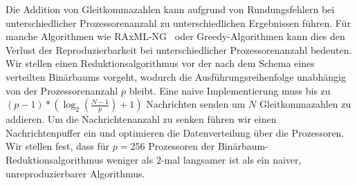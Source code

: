 
\Abstract
Die Addition von Gleitkommazahlen kann aufgrund von Rundungsfehlern bei unterschiedlicher Prozessorenanzahl zu unterschiedlichen Ergebnissen führen.
Für manche Algorithmen wie RAxML-NG~\cite{kozlov_raxml-ng_2019} oder Greedy-Algorithmen kann dies den Verlust der Reproduzierbarkeit bei unterschiedlicher Prozessorenanzahl bedeuten.
Wir stellen einen Reduktionsalgorithmus vor der nach dem Schema eines verteilten Binärbaums vorgeht, wodurch die Ausführungsreihenfolge unabhängig von der Prozessorenanzahl $p$ bleibt.
Eine naive Implementierung muss bis zu $(p - 1) * (\log_2 (\tfrac{N-1}{p}) + 1)$ Nachrichten senden um $N$ Gleitkommazahlen zu addieren.
Um die Nachrichtenanzahl zu senken führen wir einen Nachrichtenpuffer ein und optimieren die Datenverteilung über die Prozessoren.
Wir stellen fest, dass für $p=256$ Prozessoren der Binärbaum-Reduktionsalgorithmus weniger als $2$-mal langsamer ist als ein naiver, unreproduzierbarer Algorithmus.